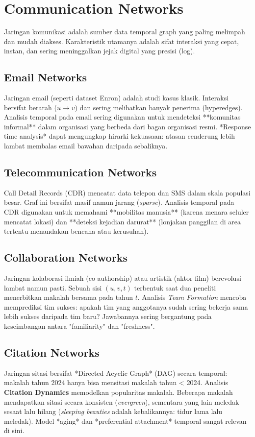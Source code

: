 \documentclass[12pt,a4paper]{book}
\begin{document}
\chapter{Communication Networks}
Jaringan komunikasi adalah sumber data temporal graph yang paling melimpah dan mudah diakses. Karakteristik utamanya adalah sifat interaksi yang cepat, instan, dan sering meninggalkan jejak digital yang presisi (log).

\section{Email Networks}
Jaringan email (seperti dataset Enron) adalah studi kasus klasik. Interaksi bersifat berarah ($u \to v$) dan sering melibatkan banyak penerima (hyperedges).
Analisis temporal pada email sering digunakan untuk mendeteksi **komunitas informal** dalam organisasi yang berbeda dari bagan organisasi resmi. *Response time analysis* dapat mengungkap hirarki kekuasaan: atasan cenderung lebih lambat membalas email bawahan daripada sebaliknya.

\section{Telecommunication Networks}
Call Detail Records (CDR) mencatat data telepon dan SMS dalam skala populasi besar.
Graf ini bersifat masif namun jarang (\textit{sparse}). Analisis temporal pada CDR digunakan untuk memahami **mobilitas manusia** (karena menara seluler mencatat lokasi) dan **deteksi kejadian darurat** (lonjakan panggilan di area tertentu menandakan bencana atau kerusuhan).

\section{Collaboration Networks}
Jaringan kolaborasi ilmiah (co-authorship) atau artistik (aktor film) berevolusi lambat namun pasti.
Sebuah sisi $(u, v, t)$ terbentuk saat dua peneliti menerbitkan makalah bersama pada tahun $t$. Analisis \textit{Team Formation} mencoba memprediksi tim sukses: apakah tim yang anggotanya sudah sering bekerja sama lebih sukses daripada tim baru? Jawabannya sering bergantung pada keseimbangan antara "familiarity" dan "freshness".

\section{Citation Networks}
Jaringan sitasi bersifat *Directed Acyclic Graph* (DAG) secara temporal: makalah tahun 2024 hanya bisa mensitasi makalah tahun < 2024.
Analisis \textbf{Citation Dynamics} memodelkan popularitas makalah. Beberapa makalah mendapatkan sitasi secara konsisten (\textit{evergreen}), sementara yang lain meledak sesaat lalu hilang (\textit{sleeping beauties} adalah kebalikannya: tidur lama lalu meledak). Model *aging* dan *preferential attachment* temporal sangat relevan di sini.
\end{document}
